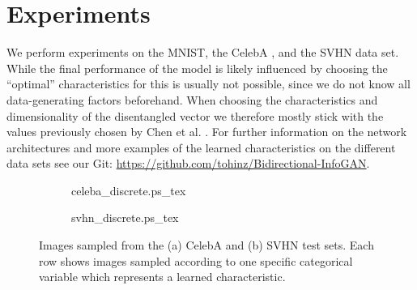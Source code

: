 \documentclass{esannV2}
\begin{document}
\section{Experiments}
We perform experiments on the MNIST, the CelebA \cite{Liu2015}, and the SVHN \cite{Netzer2011} data set. While the final performance of the model is likely influenced by choosing the ``optimal'' characteristics for  this is usually not possible, since we do not know all data-generating factors beforehand. When choosing the characteristics and dimensionality of the disentangled vector  we therefore mostly stick with the values previously chosen by Chen et al. \cite{Chen2016}.
For further information on the network architectures and more examples of the learned characteristics on the different data sets see our Git: \url{https://github.com/tohinz/Bidirectional-InfoGAN}.

\begin{figure}
\centering
\begin{subfigure}[b]{0.8\textwidth}
\begin{footnotesize}
\def\svgwidth{\linewidth}
\def\svgscale{0.5}
{celeba_discrete.ps_tex}
\end{footnotesize}
\vspace{-0.6cm}
\caption{}
\label{fig:celeba}
\end{subfigure}

\begin{subfigure}[b]{0.8\textwidth}
\begin{footnotesize}
\def\svgwidth{\linewidth}
\def\svgscale{0.5}
{svhn_discrete.ps_tex}
\end{footnotesize}
\vspace{-0.6cm}
\caption{}
\label{fig:svhn}
\end{subfigure}

\caption{Images sampled from the (a) CelebA and (b) SVHN test sets. Each row shows images sampled according to one specific categorical variable  which represents a learned characteristic.}
\vspace{-0.3cm}
\label{fig:celeba:svhn}
\end{figure}
\end{document}
